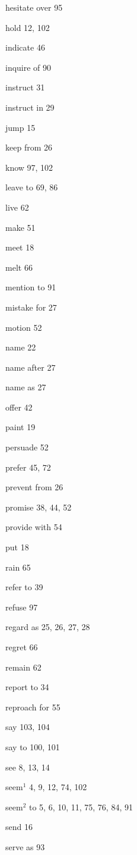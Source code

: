 \begin{theindex}
\item hesitate over  95
\item hold  12, 102
\item indicate  46 
\item inquire of  90
\item instruct  31 
\item instruct in  29
\item jump  15 
\item keep from  26
\item know  97, 102
\item leave to  69, 86
\item live  62 
\item make  51 
\item meet  18 
\item melt  66
\item mention to  91
\item mistake for  27 
\item motion  52 
\item name  22 
\item name after  27 
\item name as  27 
\item offer 42
\item paint  19 
\item persuade  52 
\item prefer  45, 72
\item prevent from  26
\item promise  38, 44, 52
\item provide with 54 
\item put  18 
\item rain  65
\item refer to  39 
\item refuse  97
\item regard as  25, 26, 27, 28
\item regret  66
\item remain  62 
\item report to 34 
\item reproach for  55 
\item say  103, 104
\item say to 100, 101
\item see  8, 13, 14
\item seem$^{1}$  4, 9, 12, 74, 102
\item seem$^{2}$ to 5, 6, 10, 11, 75, 76, 84, 91
\item send  16 
\item serve as  93

\end{theindex}
